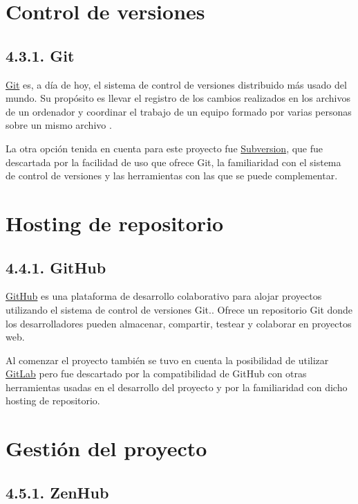 \section{Control de versiones}

\subsection{4.3.1. Git}

\href{https://git-scm.com/}{Git} es, a día de hoy, el sistema de control de versiones distribuido más usado del mundo. Su propósito es llevar el registro de los cambios realizados en los archivos de un ordenador y coordinar el trabajo de un equipo formado por varias personas sobre un mismo archivo \cite{wiki:Git}.

La otra opción tenida en cuenta para este proyecto fue \href{https://subversion.apache.org/}{Subversion}, que fue descartada por la facilidad de uso que ofrece Git, la familiaridad con el sistema de control de versiones y las herramientas con las que se puede complementar.

\section{Hosting de repositorio}

\subsection{4.4.1. GitHub}

\href{https://github.com/}{GitHub} es una plataforma de desarrollo colaborativo para alojar proyectos utilizando el sistema de control de versiones Git.\cite{wiki:github}. Ofrece un repositorio Git donde los desarrolladores pueden almacenar, compartir, testear y colaborar en proyectos web.

Al comenzar el proyecto también se tuvo en cuenta la posibilidad de utilizar \href{https://about.gitlab.com/}{GitLab} pero fue descartado por la compatibilidad de GitHub con otras herramientas usadas en el desarrollo del proyecto y por la familiaridad con dicho hosting de repositorio.

\section{Gestión del proyecto }

\subsection{4.5.1. ZenHub}

